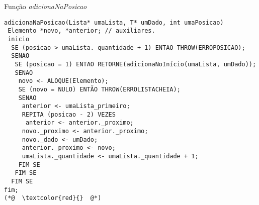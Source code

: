 \documentclass[12pt,table,xcolor={dvipsnames}]{beamer}
\begin{document}
\begin{frame}[fragile]{Função \textit{adicionaNaPosicao}}
\begin{lstlisting}
adicionaNaPosicao(Lista* umaLista, T* umDado, int umaPosicao)
 Elemento *novo, *anterior; // auxiliares.
 inicio
  SE (posicao > umaLista._quantidade + 1) ENTAO THROW(ERROPOSICAO);
  SENAO
   SE (posicao = 1) ENTAO RETORNE(adicionaNoInício(umaLista, umDado));
   SENAO
    novo <- ALOQUE(Elemento);
    SE (novo = NULO) ENTÃO THROW(ERROLISTACHEIA);
    SENAO
     anterior <- umaLista_primeiro;
     REPITA (posicao - 2) VEZES
      anterior <- anterior._proximo;
     novo._proximo <- anterior._proximo;
     novo._dado <- umDado;
     anterior._proximo <- novo;
     umaLista._quantidade <- umaLista._quantidade + 1;
    FIM SE
   FIM SE
  FIM SE
fim;
(*@  \textcolor{red}{}  @*)
\end{lstlisting}
\end{frame}
\end{document}
